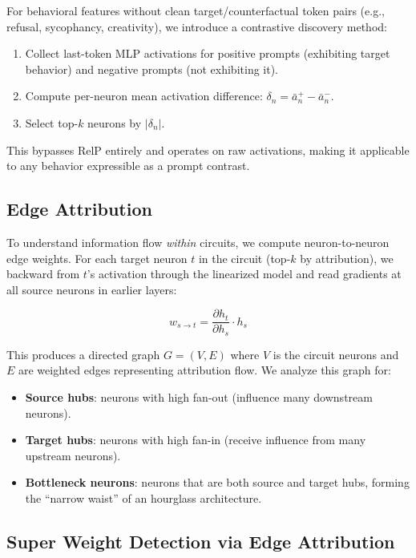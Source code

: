 \documentclass[11pt]{article}
\begin{document}
For behavioral features without clean target/counterfactual token pairs (e.g., refusal, sycophancy, creativity), we introduce a contrastive discovery method:

\begin{enumerate}
    \item Collect last-token MLP activations for positive prompts (exhibiting target behavior) and negative prompts (not exhibiting it).
    \item Compute per-neuron mean activation difference: $\delta_n = \bar{a}_n^{+} - \bar{a}_n^{-}$.
    \item Select top-$k$ neurons by $|\delta_n|$.
\end{enumerate}

This bypasses RelP entirely and operates on raw activations, making it applicable to any behavior expressible as a prompt contrast.

\subsection{Edge Attribution}
\label{sec:edges}

To understand information flow \emph{within} circuits, we compute neuron-to-neuron edge weights.
For each target neuron $t$ in the circuit (top-$k$ by attribution), we backward from $t$'s activation through the linearized model and read gradients at all source neurons in earlier layers:

\begin{equation}
    w_{s \to t} = \frac{\partial h_t}{\partial h_s} \cdot h_s
\end{equation}

This produces a directed graph $G = (V, E)$ where $V$ is the circuit neurons and $E$ are weighted edges representing attribution flow.
We analyze this graph for:
\begin{itemize}
    \item \textbf{Source hubs}: neurons with high fan-out (influence many downstream neurons).
    \item \textbf{Target hubs}: neurons with high fan-in (receive influence from many upstream neurons).
    \item \textbf{Bottleneck neurons}: neurons that are both source and target hubs, forming the ``narrow waist'' of an hourglass architecture.
\end{itemize}

\subsection{Super Weight Detection via Edge Attribution}
\label{sec:superweights}
\end{document}
